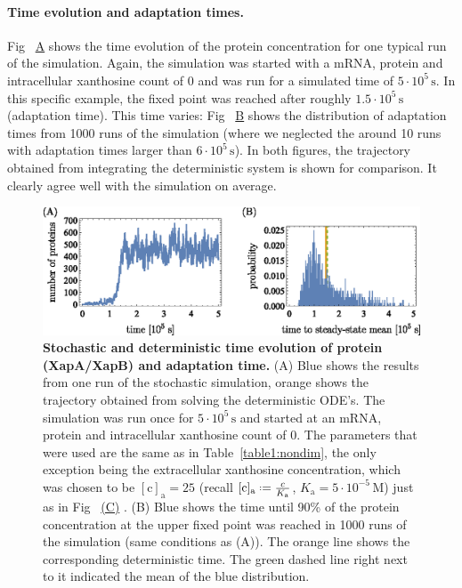 \documentclass[10pt,letterpaper]{article}
\newcommand{\unit}[1]{\,\mathrm{#1}}
\newcommand{\n}[1]{\mathrm{#1}}
\newcommand*{\defeq}{\mathrel{\vcenter{\baselineskip0.5ex \lineskiplimit0pt
			\hbox{\scriptsize.}\hbox{\scriptsize.}}}%
	=}
\newcommand\subref[2]{%
	\def\myref{\getrefnumber{#1}}%
	\hyperref[#1]{\myref\mbox{#2}}%
}
\begin{document}
	\paragraph*{Time evolution and adaptation times.}
	Fig~\subref{fig9:StochT}{A} shows the time evolution of the protein concentration for one typical run of the simulation.
	Again, the simulation was started with a mRNA, protein and intracellular
	xanthosine count of 0 and was run for a simulated time of $5 \cdot 10^5
	\unit{s}$. In this specific example, the fixed point was reached after roughly $1.5 \cdot 10^5
	\unit{s}$ (adaptation time).
	This time varies: Fig~\subref{fig9:StochT}{B} shows the distribution
	of adaptation times from 1000 runs of the simulation (where we
	neglected the around 10 runs with adaptation times larger than $6
	\cdot 10^5 \unit{s}$). In both figures, the trajectory obtained from
	integrating the deterministic system is shown for comparison. It
	clearly agree well with the simulation on average.
	
	\begin{figure}%
		\centering
		\includegraphics{media/Fig9_evolution.eps}
		\caption{{\bf Stochastic and deterministic time evolution of protein (XapA/XapB) and adaptation time.}
			(A) Blue shows the results from one run of the stochastic simulation, orange shows the trajectory obtained from solving the deterministic ODE's. The simulation was run once for $5 \cdot 10^5 \unit{s}$ and started
			at an mRNA, protein and intracellular xanthosine count of 0. The parameters that were used are the same as in
			Table~\ref{table1:nondim}, the only exception being the
			extracellular xanthosine concentration, which was chosen to be
			$\n{[c]_a} = 25$ (recall $\n{[c]_{a}} \defeq \frac{c}{K_{\n{a}}}$,
			$K_{\n{a}} = 5 \cdot 10^{-5} \unit{M}$) just as in
			Fig~\subref{fig8:stochC}{(C)}. (B) Blue shows the time until 90\% of the protein concentration at the upper fixed point was reached in 1000 runs of the simulation (same conditions as (A)). The orange line shows the corresponding deterministic time. The green dashed line right next to it indicated the mean of the blue distribution.}
		\label{fig9:StochT}
	\end{figure}
	
\end{document}

